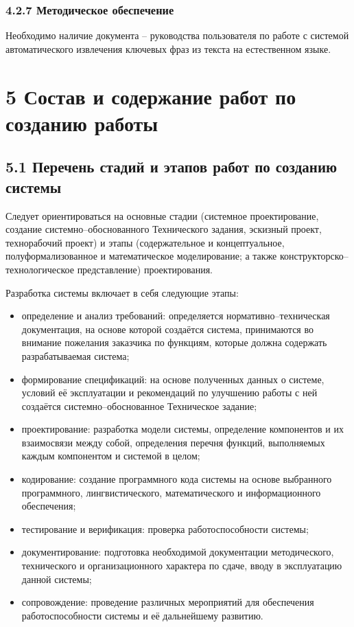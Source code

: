 \subsubsection*{4.2.7 Методическое обеспечение}
Необходимо наличие документа – руководства пользователя по работе с
системой автоматического извлечения ключевых фраз из текста на
естественном языке.

\section*{5 Состав и содержание работ по созданию работы}
\subsection*{5.1 Перечень стадий и этапов работ по созданию системы}
Следует ориентироваться на основные стадии (системное
проектирование, создание системно--обоснованного Технического
задания, эскизный проект, технорабочий проект) и этапы
(содержательное и концептуальное, полуформализованное и
математическое моделирование; а также конструкторско--технологическое
представление) проектирования.

Разработка системы включает в себя следующие этапы:
\begin{itemize}
  \item определение и анализ требований: определяется
нормативно--техническая документация, на основе которой создаётся
система, принимаются во внимание пожелания заказчика по функциям,
которые должна содержать разрабатываемая система;
  \item формирование спецификаций: на основе полученных данных о
системе, условий её эксплуатации и рекомендаций по улучшению
работы с ней создаётся системно--обоснованное Техническое задание;
  \item проектирование: разработка модели системы, определение
компонентов и их взаимосвязи между собой, определения перечня функций,
выполняемых каждым компонентом и системой в целом;
  \item кодирование: создание программного кода системы на основе
выбранного программного, лингвистического, математического и
информационного обеспечения;
  \item тестирование и верификация: проверка работоспособности
системы;
  \item документирование: подготовка необходимой документации
методического, технического и организационного характера по сдаче,
вводу в эксплуатацию данной системы;
  \item сопровождение: проведение различных мероприятий для обеспечения
работоспособности системы и её дальнейшему развитию.
\end{itemize}

